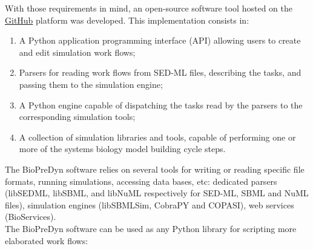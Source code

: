 \documentclass{llncs}
\begin{document}
With those requirements in mind, an open-source software tool hosted on the
\href{http://www.github.com/bmoreau/biopredyn}{GitHub} platform was developed.
This implementation consists in:
\begin{enumerate}
\item A Python application programming interface (API) allowing users to
create and edit simulation work flows;
\item Parsers for reading work flows from SED-ML files, describing the tasks,
and passing them to the simulation engine;
\item A Python engine capable of dispatching the tasks read by the parsers to
the corresponding simulation tools;
\item A collection of simulation libraries and tools, capable of performing one
or more of the systems biology model building cycle steps.
\end{enumerate}
The BioPreDyn software relies on several tools for writing or reading specific
file formats, running simulations, accessing data bases, etc: dedicated parsers
(libSEDML, libSBML, and libNuML respectively for SED-ML, SBML and NuML files),
simulation engines (libSBMLSim\cite{Takizawa2013}, CobraPY\cite{Ebrahim2013}
and COPASI\cite{Hoops2006}), web services (BioServices\cite{Cokelaer2013}).\\

The BioPreDyn software can be used as any Python library for scripting more
elaborated work flows:

{}

\end{document}
